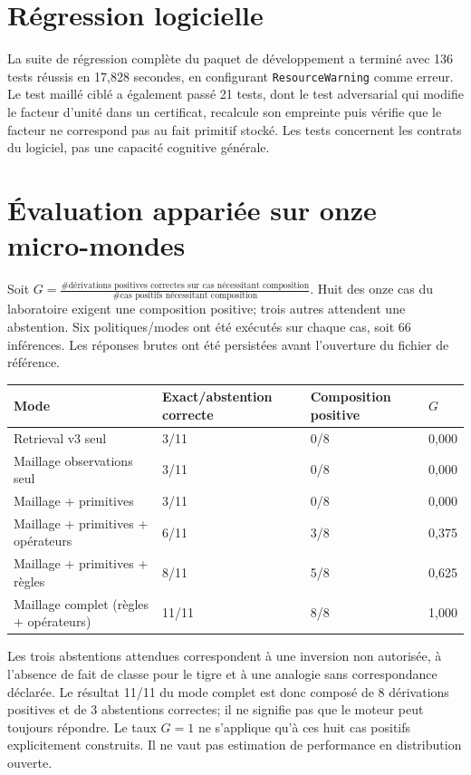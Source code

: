 \documentclass[11pt,a4paper]{book}
\begin{document}
\section{Régression logicielle}
La suite de régression complète du paquet de développement a terminé avec 136 tests réussis en 17,828 secondes, en configurant \texttt{ResourceWarning} comme erreur. Le test maillé ciblé a également passé 21 tests, dont le test adversarial qui modifie le facteur d'unité dans un certificat, recalcule son empreinte puis vérifie que le facteur ne correspond pas au fait primitif stocké. Les tests concernent les contrats du logiciel, pas une capacité cognitive générale.

\section{Évaluation appariée sur onze micro-mondes}
Soit $G=\frac{\#\text{dérivations positives correctes sur cas nécessitant composition}}{\#\text{cas positifs nécessitant composition}}$. Huit des onze cas du laboratoire exigent une composition positive; trois autres attendent une abstention. Six politiques/modes ont été exécutés sur chaque cas, soit 66 inférences. Les réponses brutes ont été persistées avant l'ouverture du fichier de référence.

\begin{center}
\small
\begin{tabular}{p{}p{}p{}p{}}
\toprule
Mode & Exact/abstention correcte & Composition positive & $G$\\
\midrule
Retrieval v3 seul & 3/11 & 0/8 & 0,000\\
Maillage observations seul & 3/11 & 0/8 & 0,000\\
Maillage + primitives & 3/11 & 0/8 & 0,000\\
Maillage + primitives + opérateurs & 6/11 & 3/8 & 0,375\\
Maillage + primitives + règles & 8/11 & 5/8 & 0,625\\
Maillage complet (règles + opérateurs) & 11/11 & 8/8 & 1,000\\
\bottomrule
\end{tabular}
\normalsize
\end{center}

Les trois abstentions attendues correspondent à une inversion non autorisée, à l'absence de fait de classe pour le tigre et à une analogie sans correspondance déclarée. Le résultat 11/11 du mode complet est donc composé de 8 dérivations positives et de 3 abstentions correctes; il ne signifie pas que le moteur peut toujours répondre. Le taux $G=1$ ne s'applique qu'à ces huit cas positifs explicitement construits. Il ne vaut pas estimation de performance en distribution ouverte.
\end{document}
